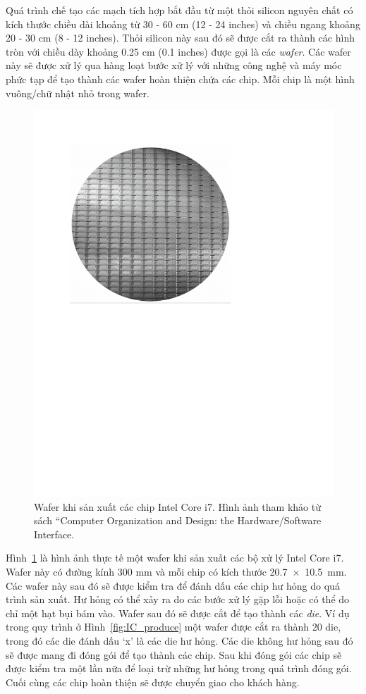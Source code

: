 Quá trình chế tạo các mạch tích hợp bắt đầu từ một thỏi silicon nguyên chất có kích thước chiều dài khoảng từ 30 - 60 cm (12 - 24 inches) và chiều ngang khoảng 20 - 30 cm (8 - 12 inches). Thỏi silicon này sau đó sẽ được cắt ra thành các hình tròn với chiều dày khoảng 0.25 cm (0.1 inches) được gọi là các \emph{wafer}. Các wafer này sẽ được xử lý qua hàng loạt bước xử lý với những công nghệ và máy móc phức tạp để tạo thành các wafer hoàn thiện chứa các chip. Mỗi chip là một hình vuông/chữ nhật nhỏ trong wafer.

\begin{figure}[!h]
	\centering
		\includegraphics[width=0.5\columnwidth]{chapter01/figure/wafer}
		\centering
	\caption{Wafer khi sản xuất các chip Intel Core i7. Hình ảnh tham khảo từ sách ``Computer Organization and Design: the Hardware/Software Interface.}
	\label{fig:wafer}
\end{figure}

Hình~\ref{fig:wafer} là hình ảnh thực tế một wafer khi sản xuất các bộ xử lý Intel Core i7. Wafer này có đường kính 300 mm và mỗi chip có kích thước \mbox{20.7 $\times$ 10.5 mm}. Các wafer này sau đó sẽ được kiểm tra để đánh dấu các chip hư hỏng do quá trình sản xuất. Hư hỏng có thể xảy ra do các bước xử lý gặp lỗi hoặc có thể do chỉ một hạt bụi bám vào. Wafer sau đó sẽ được cắt để tạo thành các \emph{die}. Ví dụ trong quy trình ở Hình~\ref{fig:IC_produce} một wafer được cắt ra thành 20 die, trong đó các die đánh dấu `x' là các die hư hỏng. Các die không hư hỏng sau đó sẽ được mang đi đóng gói để tạo thành các chip. Sau khi đóng gói các chip sẽ được kiểm tra một lần nữa để loại trừ những hư hỏng trong quá trình đóng gói. Cuối cùng các chip hoàn thiện sẽ được chuyển giao cho khách hàng.

